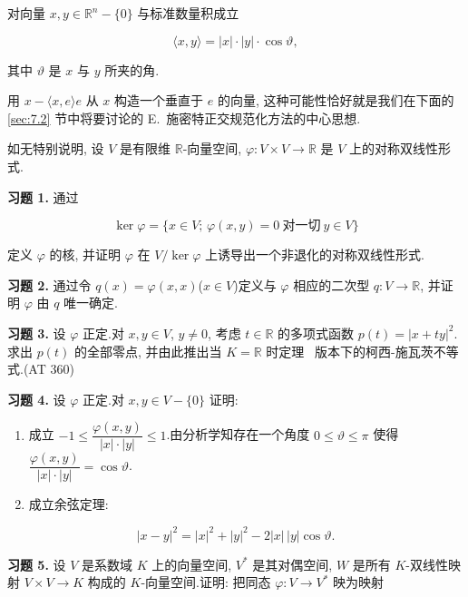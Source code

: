 \begin{theorem}\label{thm:7.1.7}
对向量 $x, y \in \mathbb{R}^n - \{0\}$ 与标准数量积成立

\[
\langle x, y \rangle = |x| \cdot |y| \cdot \cos \vartheta,
\]

其中 $\vartheta$ 是 $x$ 与 $y$ 所夹的角.
\end{theorem}

用 $x - \langle x, e \rangle e$ 从 $x$ 构造一个垂直于 $e$ 的向量, 这种可能性恰好就是我们在下面的 \ref{sec:7.2} 节中将要讨论的 E.~施密特正交规范化方法的中心思想.

\aufgaben

如无特别说明, 设 $V$ 是有限维 $\mathbb{R}$-向量空间, $\varphi \colon V \times V \longrightarrow \mathbb{R}$ 是 $V$ 上的对称双线性形式.

\medskip
\noindent\textbf{习题 1.} 通过

\[
\ker \varphi = \bigl\{x \in V;\, \varphi(x, y) = 0 \ \text{对一切} \ y \in V\bigr\}
\]

定义 $\varphi$ 的核, 并证明 $\varphi$ 在 $V/\ker \varphi$ 上诱导出一个非退化的对称双线性形式.

\medskip
\noindent\textbf{习题 2.} 通过令 $q(x) = \varphi(x, x)$($x \in V$)定义与 $\varphi$ 相应的二次型 $q \colon V \longrightarrow \mathbb{R}$, 并证明 $\varphi$ 由 $q$ 唯一确定.

\medskip
\noindent\textbf{习题 3.} 设 $\varphi$ 正定.对 $x, y \in V$, $y \neq 0$, 考虑 $t \in \mathbb{R}$ 的多项式函数 $p(t) = |x + ty|^2$.求出 $p(t)$ 的全部零点, 并由此推出当 $K = \mathbb{R}$ 时定理~ 版本下的柯西-施瓦茨不等式.(AT 360)

\medskip
\noindent\textbf{习题 4.} 设 $\varphi$ 正定.对 $x, y \in V - \{0\}$ 证明:
\begin{enumerate}
\item[(i)] 成立 $-1 \leq \dfrac{\varphi(x, y)}{|x| \cdot |y|} \leq 1$.由分析学知存在一个角度 $0 \leq \vartheta \leq \pi$ 使得 $\dfrac{\varphi(x, y)}{|x| \cdot |y|} = \cos \vartheta$.
\item[(ii)] 成立余弦定理:
\end{enumerate}

\[
|x - y|^2 = |x|^2 + |y|^2 - 2|x| \, |y| \cos \vartheta\text{.}
\]

\medskip
\noindent\textbf{习题 5.} 设 $V$ 是系数域 $K$ 上的向量空间, $V^*$ 是其对偶空间, $W$ 是所有 $K$-双线性映射 $V \times V \longrightarrow K$ 构成的 $K$-向量空间.证明: 把同态 $\varphi \colon V \longrightarrow V^*$ 映为映射

